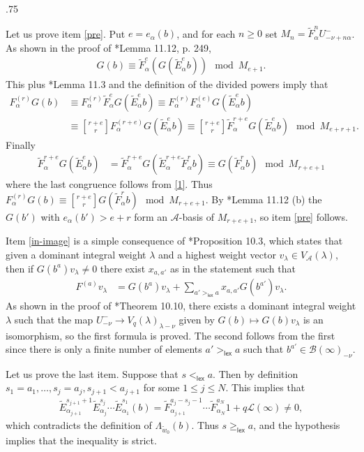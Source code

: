 \documentclass[11pt,fleqn]{article}
\makeatletter
\renewenvironment{proof}[1][\textit{Proof}]{\par
  \pushQED{\qed}%
  \normalfont \topsep.75\paraskip\relax
  \trivlist
  \item[\hskip\labelsep
        \itshape
    #1\@addpunct{.}]\ignorespaces
}{%
  \popQED\endtrivlist\@endpefalse
}
\renewcommand\to{\longrightarrow}
\newcommand\qbinom[2]{\genfrac{[}{]}{0pt}{0}{#1}{#2}}
\newcommand\A{\mathcal A}
\newcommand\B{\mathcal B}
\renewcommand\L{\mathcal L}
\newcommand\lex{\mathsf{lex}}
\makeatother
\begin{document}
\begin{proof}
Let us prove item \ref{pre}. Put $e = e_\alpha(b)$, and for each $n \geq 0$
set $M_{n} = \tilde F_\alpha^{n}U^-_{-\nu+n\alpha}$. As shown in the proof
of \cite{Jan}*{Lemma 11.12, p. 249}, 
\begin{align}
\label{1}
G(b) 
	\equiv \tilde F_\alpha^e(G(\tilde E_\alpha^e b))
	\mod M_{e+1}.
\end{align}
This plus \cite{Jan}*{Lemma 11.3} and the definition of the divided powers 
imply that
\begin{align*}
F_\alpha^{(r)} G(b) 
	&\equiv F_\alpha^{(r)} \tilde F_\alpha^{e} G(\tilde E_\alpha^e b) 
	\equiv F_\alpha^{(r)} F_\alpha^{(e)} G(\tilde E_\alpha^e b) \\
	&\equiv \qbinom{r+e}{r} F_\alpha^{(r+e)} G(\tilde E_\alpha^e b) 
	\equiv \qbinom{r+e}{r} \tilde F_\alpha^{r+e} G(\tilde E_\alpha^e b) 
	\mod M_{e+r+1}.
\end{align*}
Finally
\begin{align*}
\tilde F_\alpha^{r+e} G(\tilde E_\alpha^e b)
	&= \tilde F_\alpha^{r+e} G(\tilde E_\alpha^{r+e} \tilde F_\alpha^r b)
	\equiv G(\tilde F_\alpha^r b) \mod M_{r+e+1}
\end{align*}
where the last congruence follows from \ref{1}. Thus $F_\alpha^{(r)}G(b) 
\equiv \qbinom{r+e}{r} G(\tilde F_\alpha^rb) \mod M_{r+e+1}$. By 
\cite{Jan}*{Lemma 11.12 (b)} the $G(b')$ with $e_\alpha(b') > e+r$ form
an $\A$-basis of $M_{r+e+1}$, so item \ref{pre} follows.

Item \ref{in-image} is a simple consequence of \cite{Lit}*{Proposition 10.3},
which states that given a dominant integral weight $\lambda$ and a highest 
weight vector $v_\lambda \in V_\A(\lambda)$, then if $G(b^a) v_{\lambda} \neq 
0$ there exist $x_{a,a'}$ as in the statement such that
\begin{align*}
F^{(a)}v_\lambda
  &= G(b^a)v_\lambda + \sum_{a' >_{\lex} a} x_{a,a'} G(b^{a'})v_\lambda.
\end{align*}
As shown in the proof of \cite{Jan}*{Theorem 10.10}, there exists a dominant
integral weight $\lambda$ such that the map $U^-_{-\nu} \to 
V_q(\lambda)_{\lambda - 
\nu}$ given by $G(b) \mapsto G(b)v_\lambda$ is an isomorphism, so the first 
formula is proved. The second follows from the first since there is only a 
finite number of elements $a' >_{\lex} a$ such that $b^{a'} \in 
\B(\infty)_{-\nu}$. 

Let us prove the last item. Suppose that $s <_\lex a$. Then by definition 
$s_1 = a_1, \ldots, s_j = a_j, s_{j+1} < a_{j+1}$ for some $1 \leq j \leq N$. 
This implies that 
\begin{align*}
	\tilde E_{\alpha_{j+1}}^{s_{j+1}+1} 
		\tilde E_{\alpha_j}^{s_j} \cdots \tilde E_{\alpha_1}^{s_1}(b) 
		= \tilde F_{\alpha_{j+1}}^{a_j-s_j-1} \cdots \tilde 
			F_{\alpha_N}^{a_N}1 + q\L(\infty) \neq 0,
\end{align*}
which contradicts the definition of $\Lambda_{\tilde w_0}(b)$. Thus $s 
\geq_{\lex} a$, and the hypothesis implies that the inequality is strict.


\end{proof}
\end{document}
